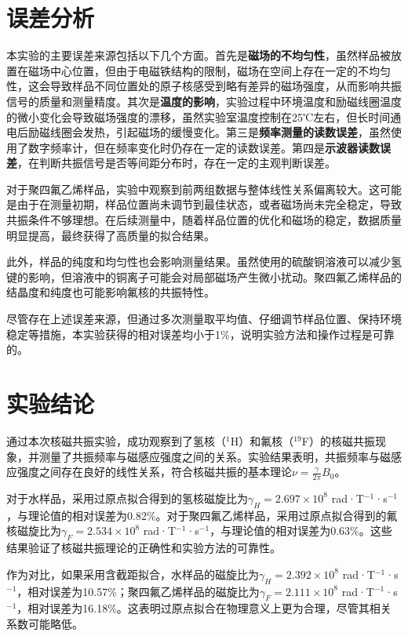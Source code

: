﻿\documentclass[12pt,a4paper]{article}
\begin{document}
\section{误差分析}

本实验的主要误差来源包括以下几个方面。首先是\textbf{磁场的不均匀性}，虽然样品被放置在磁场中心位置，但由于电磁铁结构的限制，磁场在空间上存在一定的不均匀性，这会导致样品不同位置处的原子核感受到略有差异的磁场强度，从而影响共振信号的质量和测量精度。其次是\textbf{温度的影响}，实验过程中环境温度和励磁线圈温度的微小变化会导致磁场强度的漂移，虽然实验室温度控制在25℃左右，但长时间通电后励磁线圈会发热，引起磁场的缓慢变化。第三是\textbf{频率测量的读数误差}，虽然使用了数字频率计，但在频率变化时仍存在一定的读数误差。第四是\textbf{示波器读数误差}，在判断共振信号是否等间距分布时，存在一定的主观判断误差。

对于聚四氟乙烯样品，实验中观察到前两组数据与整体线性关系偏离较大。这可能是由于在测量初期，样品位置尚未调节到最佳状态，或者磁场尚未完全稳定，导致共振条件不够理想。在后续测量中，随着样品位置的优化和磁场的稳定，数据质量明显提高，最终获得了高质量的拟合结果。

此外，样品的纯度和均匀性也会影响测量结果。虽然使用的硫酸铜溶液可以减少氢键的影响，但溶液中的铜离子可能会对局部磁场产生微小扰动。聚四氟乙烯样品的结晶度和纯度也可能影响氟核的共振特性。

尽管存在上述误差来源，但通过多次测量取平均值、仔细调节样品位置、保持环境稳定等措施，本实验获得的相对误差均小于1\%，说明实验方法和操作过程是可靠的。

\section{实验结论}

通过本次核磁共振实验，成功观察到了氢核（$^1$H）和氟核（$^{19}$F）的核磁共振现象，并测量了共振频率与磁感应强度之间的关系。实验结果表明，共振频率与磁感应强度之间存在良好的线性关系，符合核磁共振的基本理论$\nu = \frac{\gamma}{2\pi} B_0$。

对于水样品，采用过原点拟合得到的氢核磁旋比为$\gamma_H = 2.697 \times 10^8$ rad·T$^{-1}$·s$^{-1}$，与理论值的相对误差为0.82\%。对于聚四氟乙烯样品，采用过原点拟合得到的氟核磁旋比为$\gamma_F = 2.534 \times 10^8$ rad·T$^{-1}$·s$^{-1}$，与理论值的相对误差为0.63\%。这些结果验证了核磁共振理论的正确性和实验方法的可靠性。

作为对比，如果采用含截距拟合，水样品的磁旋比为$\gamma_H = 2.392 \times 10^8$ rad·T$^{-1}$·s$^{-1}$，相对误差为10.57\%；聚四氟乙烯样品的磁旋比为$\gamma_F = 2.111 \times 10^8$ rad·T$^{-1}$·s$^{-1}$，相对误差为16.18\%。这表明过原点拟合在物理意义上更为合理，尽管其相关系数可能略低。
\end{document}
